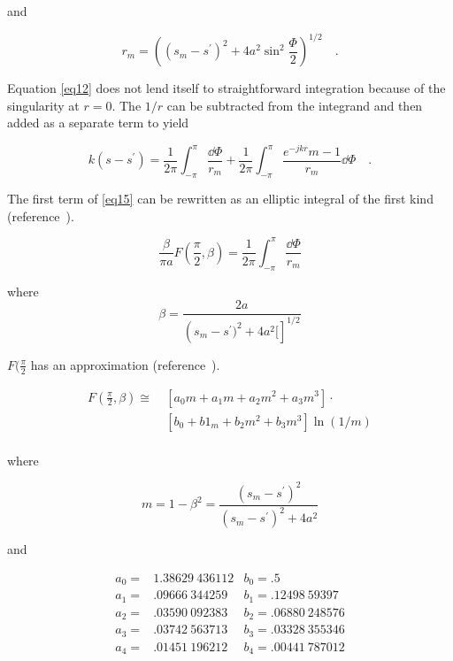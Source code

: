 \documentclass[12pt]{article}
\begin{document}
and

\begin{equation}
r_m = \left((s_m - s^\prime)^2 + 4a^2\sin^2\frac{\Phi}{2}\right)^{1/2}
\quad.
\label{eq14}
\end{equation}

Equation \eqref{eq12} does not lend itself to straightforward
integration because of the singularity at $r=0$. The $1/r$ can be
subtracted from the integrand and then added as a separate term to yield

\begin{equation}
k(s-s^\prime) = \frac{1}{2\pi}\int_{-\pi}^\pi \frac{\dd{\Phi}}{r_m}
+\frac{1}{2\pi}\int_{-\pi}^\pi\frac{e^{-jkr}m-1}{r_m}\dd{\Phi}
\quad.
\label{eq15}
\end{equation}

The first term of \eqref{eq15} can be rewritten as an elliptic integral
of the first kind (reference~\cite{r6}).

\begin{equation}
\frac{\beta}{\pi a}F\left(\frac{\pi}{2}, \beta\right) =
\frac{1}{2\pi}\int_{-\pi}^\pi\frac{\dd{\Phi}}{r_m}
\label{eq16}
\end{equation}

where
\[ \beta=\frac{2a}{\left(s_m-s^\prime)^2+4a^2[\right]^{1/2}}
\]

$F(\frac{\pi}{2}$ has an approximation (reference~\cite{r6}).

\begin{equation}
\begin{aligned}
F\left(\frac{\pi}{2}, \beta\right) \cong\
& [a_0m + a_1m + a_2m^2 + a_3m^3] \cdot     \\
& [b_0 + b1_m + b_2m^2 + b_3m^3]\ln(1/m)    \\
\end{aligned}
\label{eq17}
\end{equation}

where

\[
m = 1 - \beta^2 = \frac{(s_m - s^\prime)^2}{(s_m - s^\prime)^2 + 4a^2}
\]

and

\[
\begin{array}{lrl}
a_0 = & 1.38629\ 436112 & b_0 = .5            \\
a_1 = &  .09666\ 344259 & b_1 = .12498\ 59397  \\
a_2 = &  .03590\ 092383 & b_2 = .06880\ 248576 \\
a_3 = &  .03742\ 563713 & b_3 = .03328\ 355346 \\
a_4 = &  .01451\ 196212 & b_4 = .00441\ 787012 \\
\end{array}
\]
\end{document}
